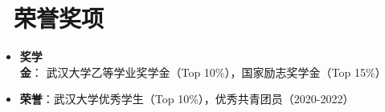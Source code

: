 \documentclass{resume}
\begin{document}

\vspace{-3mm}
\section{\faTrophy\ 荣誉奖项}
\begin{itemize}[parsep=0.5ex]
  \item \textbf{奖学金}： 武汉大学乙等学业奖学金（Top 10\%），国家励志奖学金（Top 15\%）
  \item \textbf{荣誉}：武汉大学优秀学生（Top 10\%），优秀共青团员（2020-2022）
\end{itemize}

%
%
\end{document}
